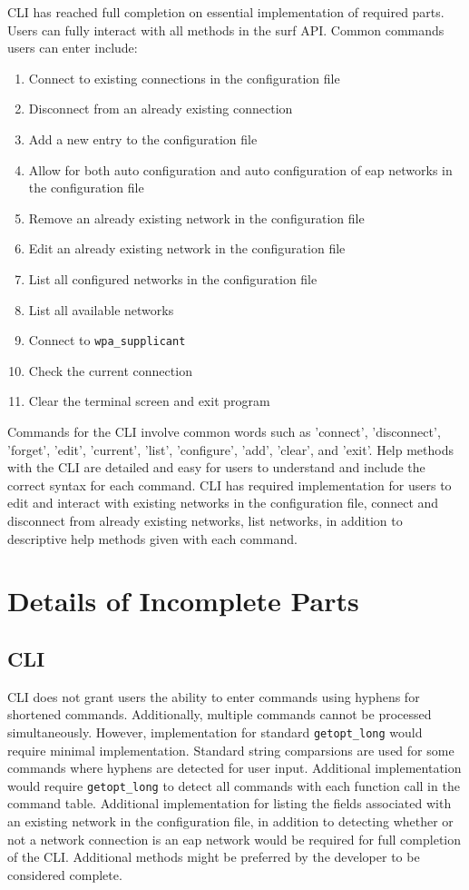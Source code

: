 \documentclass[11pt]{article}
\begin{document}
CLI has reached full completion on essential implementation of required parts. Users can 
fully interact with all methods in the surf API. Common commands users can enter include:
\begin{enumerate}
\item Connect to existing connections in the configuration file
\item Disconnect from an already existing connection
\item Add a new entry to the configuration file
\item Allow for both auto configuration and auto configuration of eap networks in the configuration file
\item Remove an already existing network in the configuration file
\item Edit an already existing network in the configuration file
\item List all configured networks in the configuration file
\item List all available networks
\item Connect to \texttt{wpa\_supplicant}
\item Check the current connection
\item Clear the terminal screen and exit program
\end{enumerate}
Commands for the CLI involve common words such as 'connect', 'disconnect', 'forget', 'edit', 
'current', 'list', 'configure', 'add', 'clear', and 'exit'. Help methods with the CLI are 
detailed and easy for users to understand and include the correct syntax for each command. 
CLI has required implementation for users to edit and interact with existing networks in the 
configuration file, connect and disconnect from already existing networks, list networks, in 
addition to descriptive help methods given with each command. \\

\section*{Details of Incomplete Parts}
\subsection*{CLI}
CLI does not grant users the ability to enter commands using hyphens for shortened commands. 
Additionally, multiple commands cannot be processed simultaneously. However, implementation for 
standard \texttt{getopt\_long} would require minimal implementation. Standard string comparsions 
are used for some commands where hyphens are detected for user input. Additional implementation 
would require \texttt{getopt\_long} to detect all commands with each function call in the command 
table. Additional implementation for listing the fields associated with an existing network in the 
configuration file, in addition to detecting whether or not a network connection is an eap network 
would be required for full completion of the CLI. Additional methods might be preferred by the 
developer to be considered complete. 
\end{document}
